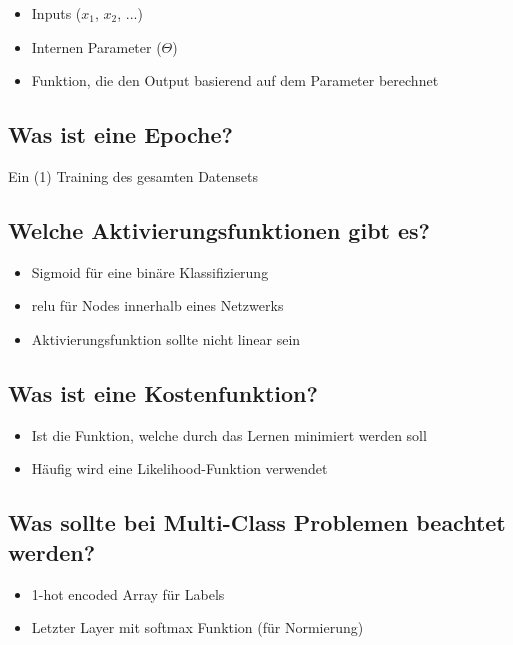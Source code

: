 \documentclass[a4paper]{article}
\begin{document}
		\begin{itemize}
			\item Inputs ($x_{1}$, $x_{2}$, ...)
			\item Internen Parameter ($\Theta$)
			\item Funktion, die den Output basierend auf dem Parameter berechnet
		\end{itemize}
	
		\subsection{Was ist eine Epoche?}
		
		Ein (1) Training des gesamten Datensets
		
		\subsection{Welche Aktivierungsfunktionen gibt es?}
		
		\begin{itemize}
			\item Sigmoid für eine binäre Klassifizierung
			\item relu für Nodes innerhalb eines Netzwerks
			\item Aktivierungsfunktion sollte nicht linear sein
		\end{itemize}
	
		\subsection{Was ist eine Kostenfunktion?}
		
		\begin{itemize}
			\item Ist die Funktion, welche durch das Lernen minimiert werden soll
			\item Häufig wird eine Likelihood-Funktion verwendet
		\end{itemize}
	
		\subsection{Was sollte bei Multi-Class Problemen beachtet werden?}
		
		\begin{itemize}
			\item 1-hot encoded Array für Labels
			\item Letzter Layer mit softmax Funktion (für Normierung)
		\end{itemize}
	
\end{document}
